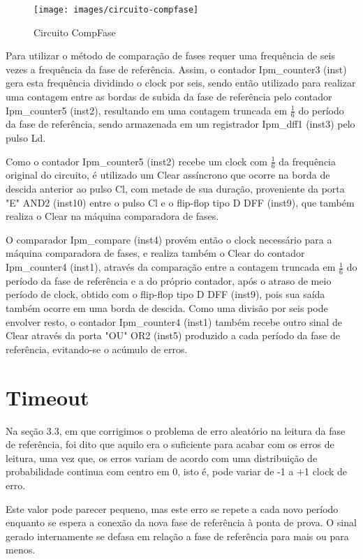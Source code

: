 \documentclass[12pt,a4paper,openany]{abntex2}
\begin{document}
\begin{figure}[!htp]
	\centering
	\caption{Circuito CompFase}
	\texttt{[image: images/circuito-compfase]}	\label{fig:circuito-compfase}
\end{figure}

Para utilizar o método de comparação de fases requer uma frequência de seis vezes a frequência da fase de referência. Assim, o contador Ipm\_counter3 (inst) gera esta frequência dividindo o clock por seis, sendo então utilizado para realizar uma contagem entre as bordas de subida da fase de referência pelo contador Ipm\_counter5 (inst2), resultando em uma contagem truncada em $\frac{1}{6}$ do período da fase de referência, sendo armazenada em um registrador Ipm\_dff1 (inst3) pelo pulso Ld.

Como o contador Ipm\_counter5 (inst2) recebe um clock com $\frac{1}{6}$ da
frequência original do circuito, é utilizado um Clear assíncrono que ocorre na borda de descida anterior ao pulso Cl, com metade de sua duração, proveniente da porta "E" AND2 (inst10) entre o pulso Cl e o flip-flop tipo D DFF (inst9), que também realiza o Clear na máquina comparadora de fases.

O comparador Ipm\_compare (inst4) provém então o clock necessário para a
máquina comparadora de fases, e realiza também o Clear do contador Ipm\_counter4 (inst1), através da comparação entre a contagem truncada em $\frac{1}{6}$ do período da fase de referência e a do próprio contador, após o atraso de meio período de clock, obtido com o flip-flop tipo D DFF (inst9), pois sua saída também ocorre em uma borda de descida. Como uma divisão por seis pode envolver resto, o contador Ipm\_counter4 (inst1) também recebe outro sinal de Clear através da porta "OU" OR2 (inst5) produzido a cada período da fase de referência, evitando-se o acúmulo de erros.

\section{Timeout}

Na seção 3.3, em que corrigimos o problema de erro aleatório na leitura da fase de referência, foi dito que aquilo era o suficiente para acabar com os erros de leitura, uma vez que, os erros variam de acordo com uma distribuição de probabilidade continua com centro em 0, isto é, pode variar de -1 a +1 clock de erro.

Este valor pode parecer pequeno, mas este erro se repete a cada novo período enquanto se espera a conexão da nova fase de referência à ponta de prova. O sinal gerado internamente se defasa em relação a fase de referência para mais ou para menos.
\end{document}
